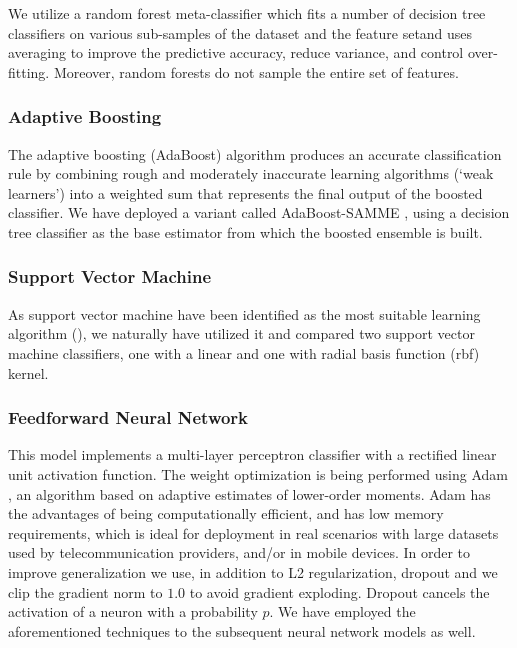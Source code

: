 \documentclass[letterpaper]{article}
\begin{document}
We utilize a random forest meta-classifier which fits a number of decision tree classifiers on various sub-samples of the dataset and the feature setand uses averaging to improve the predictive accuracy, reduce variance, and control over-fitting. Moreover, random forests do not sample the entire set of features.

\subsubsection{Adaptive Boosting}  \label{Adaptive Boosting}

The adaptive boosting (AdaBoost) algorithm \cite{freund1997decision} produces an accurate classification rule by combining rough and moderately inaccurate learning algorithms (`weak learners') into a weighted sum that represents the final output of the boosted classifier. We have deployed a variant called AdaBoost-SAMME \cite{hastie2009multi}, using a decision tree classifier as the base estimator from which the boosted ensemble is built.

\subsubsection{Support Vector Machine}  \label{Support Vector Machine}

As support vector machine have been identified as the most suitable learning algorithm (\cite{yang1999evaluation}), we naturally have utilized it and compared two support vector machine classifiers, one with a linear and one with radial basis function (rbf) kernel. 

\subsubsection{Feedforward Neural Network}  \label{Feedforward Neural Network}

This model implements a multi-layer perceptron classifier with a rectified linear unit activation function. The weight optimization is being performed using Adam \cite{DBLP:journals/corr/KingmaB14}, an algorithm based on adaptive estimates of lower-order moments. Adam has the advantages of being computationally efficient, and has low memory requirements, which is ideal for deployment in real scenarios with large datasets used by telecommunication providers, and/or in mobile devices. In order to improve generalization we use, in addition to L2 regularization, dropout \cite{Srivastava2014} and we clip the gradient norm to $1.0$ to avoid gradient exploding. Dropout cancels the activation of a neuron with a probability $p$. We have employed the aforementioned techniques to the subsequent neural network models as well.
\end{document}
